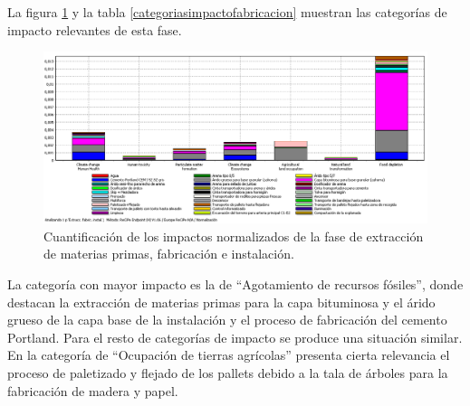 La figura \ref{fig:fabric_normalizacion} y la tabla \ref{categoriasimpactofabricacion} muestran las categorías de impacto relevantes de esta fase.

\begin{figure}[!htb]
\centering
\includegraphics[width=15cm]{img/fabric_normalizacion.png}
\caption{Cuantificación de los impactos normalizados de la fase de extracción de materias primas, fabricación e instalación.}
\label{fig:fabric_normalizacion}
\end{figure}

La categoría con mayor impacto es la de ``Agotamiento de recursos fósiles'', donde destacan la extracción de materias primas para la capa bituminosa y el árido grueso de la capa base de la instalación y el proceso de fabricación del cemento Portland. Para el resto de categorías de impacto se produce una situación similar. En la categoría de ``Ocupación de tierras agrícolas'' presenta cierta relevancia el proceso de paletizado y flejado de los pallets debido a la tala de árboles para la fabricación de madera y papel.

